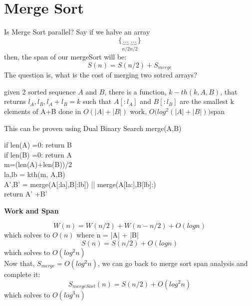 \documentclass[12pt]{article}
\begin{document}
\section{Merge Sort}
Is Merge Sort parallel? 
Say if we halve an array
$$\{\underbrace{...}_{n/2}\underbrace{...}_{n/2}\}$$
then, the span of our mergeSort will be:
$$S(n) = S(n/2) + S_{merge}$$
The question is, what is the cost of merging two sotred arrays?
\begin{claim}
given 2 sorted sequence $A$ and $B$, there is a function, $k-th(k,A,B)$, that returns $l_A,l_B, l_A +l_B = k$ such that $A[:l_A]$ and $B[:l_B]$ are the smallest k elements of A+B done in $O(|A|+|B|)$ work, $O(log^2{(|A|+|B|))} $span
\end{claim}
This can be proven using Dual Binary Search
merge(A,B)\\
\begin{algorithm}
if len(A) =0: 
return B\\
if len(B) =0: return A \\
m=(len(A)+len(B))/2 \\
la,lb = kth(m, A,B) \\
A',B' = merge(A[:la],B[:lb]) || merge(A[la:],B[lb]:)\\
return A' +B'
\end{algorithm}


\textbf{Work and Span}

$$W(n) = W(n/2) + W(n-n/2) + O(log{n})$$
which solves to $O(n)$ where n = |A| + |B|\\

$$S(n) = S(n/2) + O(log{n})$$
which solves to $O(log^2n)$\\

Now that, $S_{merge} = O(log^2n)$,
we can go back to merge sort span analysis and complete it:
$$S_{mergeSort}(n) = S(n/2) + O(log^2n)$$
which solves to $O(log^3n)$
\end{document}
